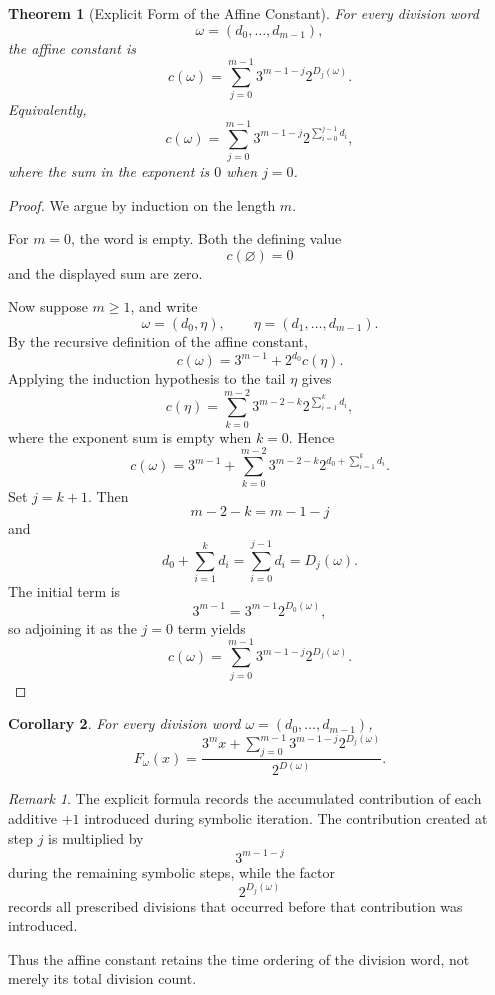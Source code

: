 \documentclass[12pt, oneside]{article}
\numberwithin{equation}{section}
\theoremstyle{definition}
\theoremstyle{plain}
\newtheorem{theorem}{Theorem}[section]
\newtheorem{corollary}[theorem]{Corollary}
\theoremstyle{remark}
\newtheorem*{remark}{Remark}
\begin{document}
\begin{theorem}[Explicit Form of the Affine Constant]
\label{thm:explicit-affine-constant}
For every division word
\[
\omega=(d_0,\dots,d_{m-1}),
\]
the affine constant is
\[
c(\omega)
=
\sum_{j=0}^{m-1}
3^{m-1-j}2^{D_j(\omega)}.
\]
Equivalently,
\[
c(\omega)
=
\sum_{j=0}^{m-1}
3^{m-1-j}
2^{\sum_{i=0}^{j-1}d_i},
\]
where the sum in the exponent is \(0\) when \(j=0\).
\end{theorem}

\begin{proof}
We argue by induction on the length \(m\).

For \(m=0\), the word is empty. Both the defining value
\[
c(\varnothing)=0
\]
and the displayed sum are zero.

Now suppose \(m\ge1\), and write
\[
\omega=(d_0,\eta),
\qquad
\eta=(d_1,\dots,d_{m-1}).
\]
By the recursive definition of the affine constant,
\[
c(\omega)
=
3^{m-1}
+
2^{d_0}c(\eta).
\]
Applying the induction hypothesis to the tail \(\eta\) gives
\[
c(\eta)
=
\sum_{k=0}^{m-2}
3^{m-2-k}
2^{\sum_{i=1}^{k}d_i},
\]
where the exponent sum is empty when \(k=0\). Hence
\[
c(\omega)
=
3^{m-1}
+
\sum_{k=0}^{m-2}
3^{m-2-k}
2^{d_0+\sum_{i=1}^{k}d_i}.
\]
Set \(j=k+1\). Then
\[
m-2-k=m-1-j
\]
and
\[
d_0+\sum_{i=1}^{k}d_i
=
\sum_{i=0}^{j-1}d_i
=
D_j(\omega).
\]
The initial term is
\[
3^{m-1}
=
3^{m-1}2^{D_0(\omega)},
\]
so adjoining it as the \(j=0\) term yields
\[
c(\omega)
=
\sum_{j=0}^{m-1}
3^{m-1-j}2^{D_j(\omega)}.
\]
\end{proof}

\begin{corollary}
For every division word \(\omega=(d_0,\dots,d_{m-1})\),
\[
F_\omega(x)
=
\frac{
3^m x
+
\displaystyle\sum_{j=0}^{m-1}
3^{m-1-j}2^{D_j(\omega)}
}
{2^{D(\omega)}}.
\]
\end{corollary}

\begin{remark}
The explicit formula records the accumulated contribution of each
additive \(+1\) introduced during symbolic iteration. The contribution
created at step \(j\) is multiplied by
\[
3^{m-1-j}
\]
during the remaining symbolic steps, while the factor
\[
2^{D_j(\omega)}
\]
records all prescribed divisions that occurred before that contribution
was introduced.

Thus the affine constant retains the time ordering of the division word,
not merely its total division count.
\end{remark}

\end{document}
